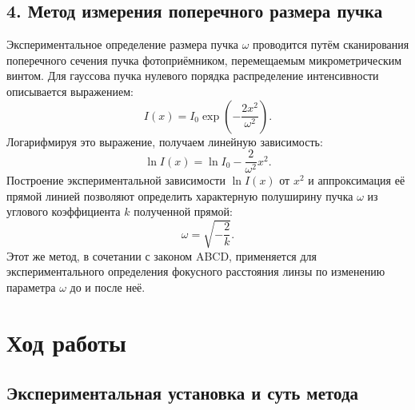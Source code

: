 \documentclass[12pt, a4paper]{article}
\begin{document}
\subsection*{4. Метод измерения поперечного размера пучка}
Экспериментальное определение размера пучка $\omega$ проводится путём сканирования поперечного сечения пучка фотоприёмником, перемещаемым микрометрическим винтом. Для гауссова пучка нулевого порядка распределение интенсивности описывается выражением:
\begin{equation}
    I(x) = I_0 \exp\left(-\frac{2x^2}{\omega^2}\right).
\end{equation}
Логарифмируя это выражение, получаем линейную зависимость:
\begin{equation}
    \ln I(x) = \ln I_0 - \frac{2}{\omega^2} x^2.
\end{equation}
Построение экспериментальной зависимости $\ln I(x)$ от $x^2$ и аппроксимация её прямой линией позволяют определить характерную полуширину пучка $\omega$ из углового коэффициента $k$ полученной прямой:
\begin{equation}
    \omega = \sqrt{-\frac{2}{k}}.
\end{equation}
Этот же метод, в сочетании с законом ABCD, применяется для экспериментального определения фокусного расстояния линзы по изменению параметра $\omega$ до и после неё.










\section*{Ход работы}

\subsection*{Экспериментальная установка и суть метода}
\end{document}
